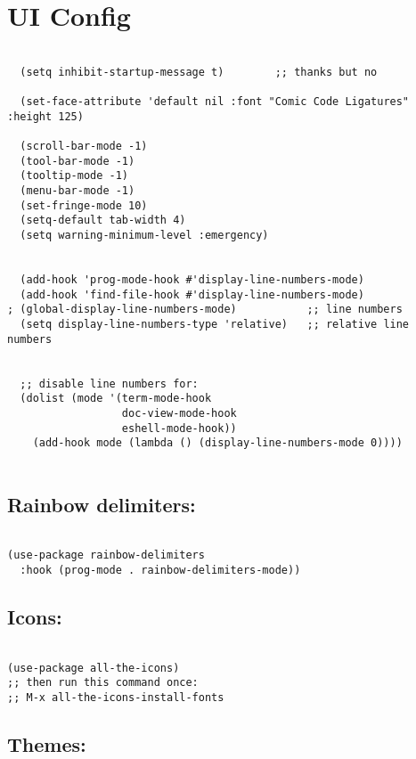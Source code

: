 \documentclass[11pt]{article}
\begin{document}
\section{UI Config}
\label{sec:org6360ee2}

\begin{verbatim}

  (setq inhibit-startup-message t)        ;; thanks but no

  (set-face-attribute 'default nil :font "Comic Code Ligatures" :height 125)

  (scroll-bar-mode -1)
  (tool-bar-mode -1)
  (tooltip-mode -1)
  (menu-bar-mode -1)
  (set-fringe-mode 10)
  (setq-default tab-width 4)
  (setq warning-minimum-level :emergency)


  (add-hook 'prog-mode-hook #'display-line-numbers-mode)
  (add-hook 'find-file-hook #'display-line-numbers-mode)
; (global-display-line-numbers-mode)           ;; line numbers
  (setq display-line-numbers-type 'relative)   ;; relative line numbers


  ;; disable line numbers for:
  (dolist (mode '(term-mode-hook
				  doc-view-mode-hook
				  eshell-mode-hook))
	(add-hook mode (lambda () (display-line-numbers-mode 0))))


\end{verbatim}

\subsection{Rainbow delimiters:}
\label{sec:org8340823}

\begin{verbatim}

(use-package rainbow-delimiters
  :hook (prog-mode . rainbow-delimiters-mode))

\end{verbatim}

\subsection{Icons:}
\label{sec:org69edbdf}

\begin{verbatim}

(use-package all-the-icons)
;; then run this command once:
;; M-x all-the-icons-install-fonts

\end{verbatim}

\subsection{Themes:}
\label{sec:org386ade8}
\end{document}
